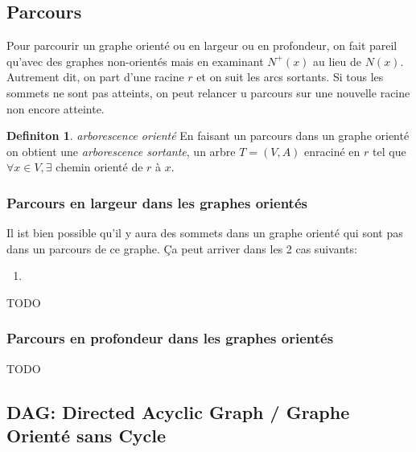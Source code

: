 \documentclass[french]{article}
\theoremstyle{definition}
\newtheorem{definition}{Definiton}[subsection]
\begin{document}
		\subsection{Parcours}
		Pour parcourir un graphe orienté ou en largeur ou en profondeur, on fait pareil qu'avec des graphes non-orientés mais en examinant $N^+(x)$ au lieu de $N(x)$. Autrement dit, on part d'une racine $r$ et on suit les arcs sortants. Si tous les sommets ne sont pas atteints, on peut relancer u parcours sur une nouvelle racine non encore atteinte.\\
		\begin{definition}{\textit{arborescence orienté}} 
			En faisant un parcours dans un graphe orienté on obtient une \textit{arborescence sortante}, un arbre $T = (V, A)$ enraciné en $r$ tel que $\forall x \in V, \exists$ chemin orienté de $r$ à $x$.
		\end{definition}
		\subsubsection{Parcours en largeur dans les graphes orientés}

		Il ist bien possible qu'il y aura des sommets dans un graphe orienté qui sont pas dans un parcours de ce graphe. Ça peut arriver dans les 2 cas suivants:
		\begin{enumerate}
			\item 
		\end{enumerate}
		TODO
		\subsubsection{Parcours en profondeur dans les graphes orientés}
		TODO
		\subsection{DAG: Directed Acyclic Graph / Graphe Orienté sans Cycle}
		
\end{document}
